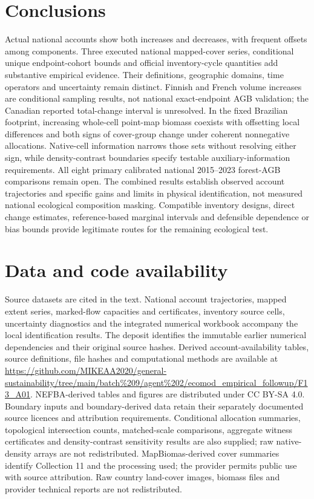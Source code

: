 \documentclass[11pt,a4paper]{article}
\begin{document}
\section{Conclusions}
Actual national accounts show both increases and decreases, with frequent offsets among components. Three executed national mapped-cover series, conditional unique endpoint-cohort bounds and official inventory-cycle quantities add substantive empirical evidence. Their definitions, geographic domains, time operators and uncertainty remain distinct. Finnish and French volume increases are conditional sampling results, not national exact-endpoint AGB validation; the Canadian reported total-change interval is unresolved. In the fixed Brazilian footprint, increasing whole-cell point-map biomass coexists with offsetting local differences and both signs of cover-group change under coherent nonnegative allocations. Native-cell information narrows those sets without resolving either sign, while density-contrast boundaries specify testable auxiliary-information requirements. All eight primary calibrated national 2015--2023 forest-AGB comparisons remain open. The combined results establish observed account trajectories and specific gains and limits in physical identification, not measured national ecological composition masking. Compatible inventory designs, direct change estimates, reference-based marginal intervals and defensible dependence or bias bounds provide legitimate routes for the remaining ecological test.

\section*{Data and code availability}
Source datasets are cited in the text. National account trajectories, mapped extent series, marked-flow capacities and certificates, inventory source cells, uncertainty diagnostics and the integrated numerical workbook accompany the local identification results. The deposit identifies the immutable earlier numerical dependencies and their original source hashes. Derived account-availability tables, source definitions, file hashes and computational methods are available at \url{https://github.com/MIKEAA2020/general-sustainability/tree/main/batch%209/agent%202/ecomod_empirical_followup/F13_A01}. NEFBA-derived tables and figures are distributed under CC BY-SA 4.0. Boundary inputs and boundary-derived data retain their separately documented source licences and attribution requirements. Conditional allocation summaries, topological intersection counts, matched-scale comparisons, aggregate witness certificates and density-contrast sensitivity results are also supplied; raw native-density arrays are not redistributed. MapBiomas-derived cover summaries identify Collection 11 and the processing used; the provider permits public use with source attribution. Raw country land-cover images, biomass files and provider technical reports are not redistributed.
\end{document}
